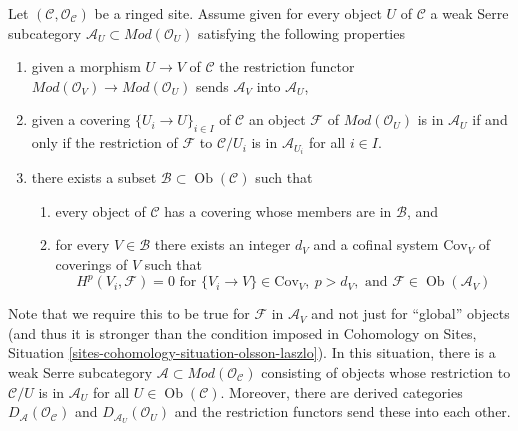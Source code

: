 \documentclass{stacks-project}
\theoremstyle{plain}
\theoremstyle{definition}
\theoremstyle{remark}
\numberwithin{equation}{subsection}
\def\Ob{\mathop{\mathrm{Ob}}\nolimits}
\begin{document}
\medskip\noindent
Let $(\mathcal{C}, \mathcal{O}_\mathcal{C})$ be a ringed site.
Assume given for every object $U$ of $\mathcal{C}$
a weak Serre subcategory $\mathcal{A}_U \subset \textit{Mod}(\mathcal{O}_U)$
satisfying the following properties
\begin{enumerate}
\item
\label{item-restriction}
given a morphism $U \to V$ of $\mathcal{C}$ the restriction
functor $\textit{Mod}(\mathcal{O}_V) \to \textit{Mod}(\mathcal{O}_U)$
sends $\mathcal{A}_V$ into $\mathcal{A}_U$,
\item
\label{item-local}
given a covering $\{U_i \to U\}_{i \in I}$ of $\mathcal{C}$
an object $\mathcal{F}$ of $\textit{Mod}(\mathcal{O}_U)$
is in $\mathcal{A}_U$ if and only if the restriction of
$\mathcal{F}$ to $\mathcal{C}/U_i$ is in $\mathcal{A}_{U_i}$
for all $i \in I$.
\item
\label{item-bounded-dimension}
there exists a subset $\mathcal{B} \subset \Ob(\mathcal{C})$
such that
\begin{enumerate}
\item every object of $\mathcal{C}$ has a covering whose
members are in $\mathcal{B}$, and
\item for every $V \in \mathcal{B}$ there exists an integer $d_V$
and a cofinal system $\text{Cov}_V$ of coverings of $V$ such
that
$$
H^p(V_i, \mathcal{F}) = 0 \text{ for }
\{V_i \to V\} \in \text{Cov}_V,\ p > d_V, \text{ and }
\mathcal{F} \in \Ob(\mathcal{A}_V)
$$
\end{enumerate}
\end{enumerate}
Note that we require this to be true for $\mathcal{F}$ in
$\mathcal{A}_V$ and not just for ``global'' objects
(and thus it is stronger than the condition imposed in
Cohomology on Sites, Situation \ref{sites-cohomology-situation-olsson-laszlo}).
In this situation, there is a weak Serre subcategory
$\mathcal{A} \subset \textit{Mod}(\mathcal{O}_\mathcal{C})$
consisting of objects whose restriction to $\mathcal{C}/U$
is in $\mathcal{A}_U$ for all $U \in \Ob(\mathcal{C})$.
Moreover, there are derived categories
$D_\mathcal{A}(\mathcal{O}_\mathcal{C})$ and
$D_{\mathcal{A}_U}(\mathcal{O}_U)$ and the restriction
functors send these into each other.
\end{document}
